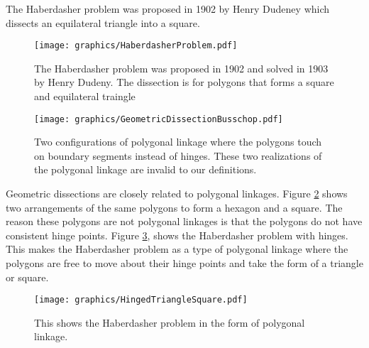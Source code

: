 The Haberdasher problem was proposed in 1902 by Henry Dudeney which dissects an equilateral triangle into a square.
\begin{figure}[!htbp]
\begin{center}
\texttt{[image: graphics/HaberdasherProblem.pdf]}
\end{center}
\caption{The Haberdasher problem was proposed in 1902 and solved in 1903 by Henry Dudeny.  The dissection is for polygons that forms a square and equilateral traingle
 }
\label{fig:polygonallinkage-5}
\end{figure}
\newpage
\begin{figure}[!htbp]
\begin{center}
\texttt{[image: graphics/GeometricDissectionBusschop.pdf]}
\end{center}
\caption{Two configurations of polygonal linkage where the polygons touch on boundary segments 
instead of hinges.  These two realizations of the polygonal linkage are invalid to our definitions. 
 }
\label{fig:polygonallinkage-4}
\end{figure}
Geometric dissections are closely related to polygonal linkages.  Figure \ref{fig:polygonallinkage-4} shows two arrangements of the same polygons to form a hexagon and a square.  The reason these polygons are not polygonal linkages is that the polygons do not have consistent hinge points.  Figure \ref{fig:HingedTriangleSquare}, shows the Haberdasher problem with hinges.  This makes the Haberdasher problem as a type of polygonal linkage where the polygons are free to move about their hinge points and take the form of a triangle or square.
\begin{figure}[!htbp]
\begin{center}
\texttt{[image: graphics/HingedTriangleSquare.pdf]}
\end{center}
\caption{This shows the Haberdasher problem in the form of polygonal linkage.}
\label{fig:HingedTriangleSquare}
\end{figure}







